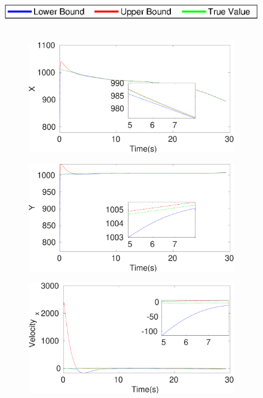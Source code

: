 \begin{figure}[h]
\includegraphics[scale=0.8]{figures/legend}\\\\
\begin{subfigure}{.5\linewidth}
\centering
\includegraphics[width=\linewidth]{figures/Prad/s3capradX}
\end{subfigure}
\begin{subfigure}{.5\linewidth}
\centering
\includegraphics[width=\linewidth]{figures/Prad/s3capradY}
\end{subfigure}
\begin{subfigure}{.5\linewidth}
\centering
\includegraphics[width=\linewidth]{figures/Prad/s3capradVelocity_x}

\end{subfigure}
\end{figure}
